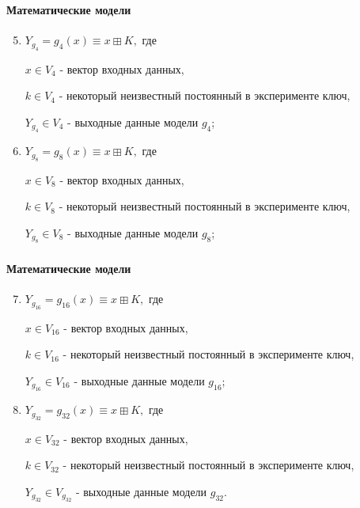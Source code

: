 \documentclass[notheorems]{beamer}
\theoremstyle{plain}
\theoremstyle{definition}
\theoremstyle{remark}
\begin{document}
\begin{frame}
	\frametitle{\secname}
	\framesubtitle{Математические модели}
	
	\begin{enumerate}
		\setcounter{enumi}{4}
		
		\item
		$Y_{g_4} = g_4(x) \equiv x \boxplus K,$ где
		
		$x \in V_{4}$ - вектор входных данных,
		
		$k \in V_{4}$ - некоторый неизвестный постоянный в эксперименте ключ,
		
		$Y_{g_4} \in V_{4}$ - выходные данные модели $g_4$;
		\bigskip
		
		\item
		$Y_{g_8} = g_8(x) \equiv x \boxplus K,$ где
		
		$x \in V_{8}$ - вектор входных данных,
		
		$k \in V_{8}$ - некоторый неизвестный постоянный в эксперименте ключ,
		
		$Y_{g_8} \in V_{8}$ - выходные данные модели $g_8$;
		\bigskip
	
		
	\end{enumerate}
	
\end{frame}

\begin{frame}
	\frametitle{\secname}
	\framesubtitle{Математические модели}
	
	\begin{enumerate}
		\setcounter{enumi}{6}
		
		
		\item
		$Y_{g_{16}} = g_{16}(x) \equiv x \boxplus K,$ где
		
		$x \in V_{16}$ - вектор входных данных,
		
		$k \in V_{16}$ - некоторый неизвестный постоянный в эксперименте ключ,
		
		$Y_{g_{16}} \in V_{16}$ - выходные данные модели $g_{16}$;
		\bigskip
		
		\item
		$Y_{g_{32}} = g_{32}(x) \equiv x \boxplus K,$ где
		
		$x \in V_{32}$ - вектор входных данных,
		
		$k \in V_{32}$ - некоторый неизвестный постоянный в эксперименте ключ,
		
		$Y_{g_{32}} \in V_{g_{32}}$ - выходные данные модели $g_{32}$.
		\bigskip
		
	\end{enumerate}
	
\end{frame}
\end{document}
